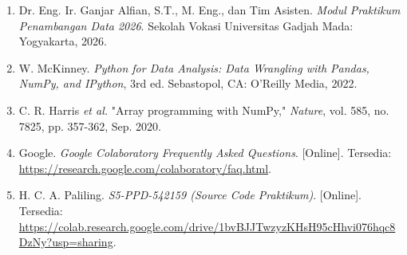 \begin{enumerate}
    \item \label{modulPraktikum} Dr. Eng. Ir. Ganjar Alfian, S.T., M. Eng., dan Tim Asisten. \textit{Modul Praktikum Penambangan Data 2026}. Sekolah Vokasi Universitas Gadjah Mada: Yogyakarta, 2026.
    
    \item \label{mckinney} W. McKinney. \textit{Python for Data Analysis: Data Wrangling with Pandas, NumPy, and IPython}, 3rd ed. Sebastopol, CA: O'Reilly Media, 2022.
    
    \item \label{harris} C. R. Harris \textit{et al.} "Array programming with NumPy," \textit{Nature}, vol. 585, no. 7825, pp. 357-362, Sep. 2020.
    
    \item \label{colab} Google. \textit{Google Colaboratory Frequently Asked Questions}. [Online]. Tersedia: \url{https://research.google.com/colaboratory/faq.html}.
    
    \item \label{sourceCode} H. C. A. Paliling. \textit{S5-PPD-542159 (Source Code Praktikum)}. [Online]. Tersedia: \url{https://colab.research.google.com/drive/1bvBJJTwzyzKHsH95cHhvi076hqc8DzNy?usp=sharing}.
\end{enumerate}